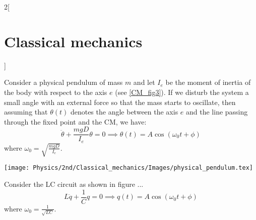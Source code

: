 \documentclass[../../../main.tex]{subfiles}
\begin{document}
\begin{multicols}{2}[\section{Classical mechanics}]
\begin{prop}
\begin{center}
\begin{minipage}{\linewidth}
            \end{minipage}
        \end{center}
    \end{prop}
    \begin{prop}
        Consider a physical pendulum of mass $m$ and let $I_e$ be the moment of inertia of the body with respect to the axis $e$ (see \cref{CM_fig3}). If we disturb the system a small angle with an external force so that the mass starts to oscillate, then assuming that $\theta(t)$ denotes the angle between the axis $e$ and the line passing through the fixed point and the CM, we have:
        $$\ddot{\theta}+\frac{mgD}{I_e}\theta=0\implies\theta(t)=A\cos(\omega_0t+\phi)$$ where $\omega_0=\sqrt{\frac{mgD}{I_e}}$.
        \begin{center}
            \begin{minipage}{\linewidth}
                \centering
                \texttt{[image: Physics/2nd/Classical\_mechanics/Images/physical\_pendulum.tex]}
                \label{CM_fig3}
            \end{minipage}
        \end{center}
    \end{prop}
    \begin{prop}
        Consider the LC circuit as shown in figure ...
        $$L\ddot{q}+\frac{1}{C}q=0\implies q(t)=A\cos(\omega_0t+\phi)$$ where $\omega_0=\frac{1}{\sqrt{LC}}$.
    \end{prop}

\end{multicols}
\end{document}
